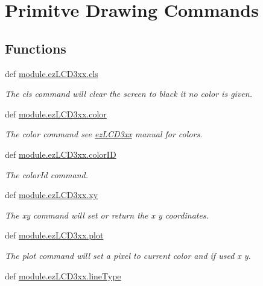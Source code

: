 \hypertarget{group___drawing}{\section{Primitve Drawing Commands}
\label{d7/df0/group___drawing}
}
\subsection*{Functions}
\begin{DoxyCompactItemize}
\item 
def \hyperlink{group___drawing_ga3524b7a565ceaa5e5290a94e870073be}{module.\-ez\-L\-C\-D3xx.\-cls}
\begin{DoxyCompactList}\small\item\em The cls command will clear the screen to black it no color is given. \end{DoxyCompactList}\item 
def \hyperlink{group___drawing_ga39b2d04e242f81f928f6e130e6fab2c7}{module.\-ez\-L\-C\-D3xx.\-color}
\begin{DoxyCompactList}\small\item\em The color command see \hyperlink{namespacemodule_1_1ez_l_c_d3xx}{ez\-L\-C\-D3xx} manual for colors. \end{DoxyCompactList}\item 
def \hyperlink{group___drawing_gaef16bad290f3f042f89d2eb684819400}{module.\-ez\-L\-C\-D3xx.\-color\-I\-D}
\begin{DoxyCompactList}\small\item\em The color\-Id command. \end{DoxyCompactList}\item 
def \hyperlink{group___drawing_ga93fdd029cb3a4fd28f006d9dac12de14}{module.\-ez\-L\-C\-D3xx.\-xy}
\begin{DoxyCompactList}\small\item\em The xy command will set or return the x y coordinates. \end{DoxyCompactList}\item 
def \hyperlink{group___drawing_gaad72ea59743ea85183832ede89d9eb22}{module.\-ez\-L\-C\-D3xx.\-plot}
\begin{DoxyCompactList}\small\item\em The plot command will set a pixel to current color and if used x y. \end{DoxyCompactList}\item 
def \hyperlink{group___drawing_gafbc7a80b227e1e7d9fb6a587a63aaba3}{module.\-ez\-L\-C\-D3xx.\-line\-Type}

\end{DoxyCompactItemize}
